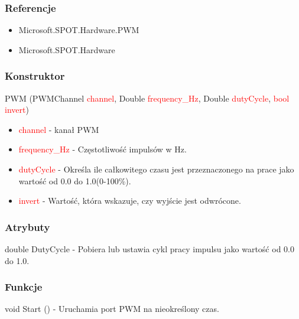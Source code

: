 \documentclass{article}
\begin{document}
\subsubsection{Referencje}
\begin{itemize}
\item Microsoft.SPOT.Hardware.PWM
\item Microsoft.SPOT.Hardware
\end{itemize}
\subsubsection{Konstruktor}
PWM (PWMChannel \textcolor{red}{channel}, Double \textcolor{red}{frequency\_Hz}, Double \textcolor{red}{dutyCycle},  \textcolor{red}{bool invert})
\begin{itemize}
\item \textcolor{red}{channel} - kanał PWM
\item \textcolor{red}{frequency\_Hz} - Częstotliwość impulsów w Hz.
\item \textcolor{red}{dutyCycle} - Określa ile całkowitego czasu jest przeznaczonego na prace jako wartość od 0.0 do 1.0(0-100\%).
\item \textcolor{red}{invert} - Wartość, która wskazuje, czy wyjście jest odwrócone.
\end{itemize}
\subsubsection{Atrybuty}
double DutyCycle - Pobiera lub ustawia cykl pracy impulsu jako wartość od 0.0 do 1.0.
\subsubsection{Funkcje}
void Start () - Uruchamia port PWM na nieokreślony czas.
\end{document}
